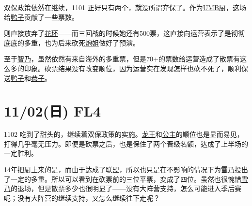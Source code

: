
双保政策依然在继续，1101 正好只有两个，就没所谓弃保了。作为\uline{UMB}厨，这场给\uline{鸭子}贡献了一些票数。

则直接放弃了\uline{花环}——而三回战的时候她还有500票，这直接向运营表示了是彻彻底底的多重，也为后来砍死\uline{炮姐}做好了预演。

至于\uline{智乃}，虽然依然有来自海外的多重票，但是70+的票数给运营造成了散票有这么多的印象。砍票结果没有改变顺位，因为运营实在发现怎样也砍不死了，顺利保送\uline{鸭子}和\uline{恭子}。

\clearpage

\section{11/02(日) FL4}


1102 吃到了甜头的，继续着双保政策的实施。\uline{龙王}和\uline{公主}的顺位也是显而易见，打得几乎毫无压力。即便是砍票之后，也是保住了两个晋级名额，达成了上半场的一定胜利。

14年把厨上来的是，而由于达成了联盟，所以也只是在不影响的情况下为\uline{雪乃}投出了一定的多重。所以可以看到在砍票前的三位平票，变成了四位。虽然也很惋惜\uline{雪乃}的退场，但是散票多少也很明显了——没有大阵营支持，怎么可能进入季后赛呢；没有大阵营的继续支持，又怎么继续往下走呢？

